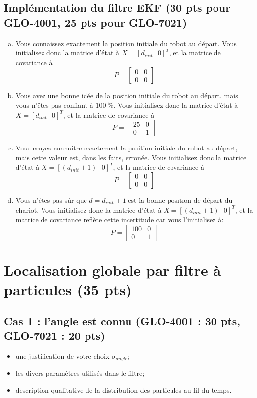 \documentclass[12pt]{article}
\begin{document}
\subsection{Implémentation du filtre EKF (30 pts pour GLO-4001, 25 pts pour GLO-7021)}
\begin{enumerate}[a)]
\item Vous connaissez exactement la position initiale du robot au départ. Vous initialisez donc la matrice d'état à $X=[d_{init} \mbox{ }0]^T$, et la matrice de covariance à
$$
P=
\begin{bmatrix}
0 &0\\
0 & 0
\end{bmatrix}
$$

\item Vous avez une bonne idée de la position initiale du robot au départ, mais vous n'êtes pas confiant à $100~\%$. Vous initialisez donc la matrice d'état à $X=[d_{init} \mbox{ }0]^T$, et la matrice de covariance à
$$
P=
\begin{bmatrix}
25 &0\\
0 & 1
\end{bmatrix}
$$

\item Vous croyez connaitre exactement la position initiale du robot au départ, mais cette valeur est, dans les faits, erronée. Vous initialisez donc la matrice d'état à $X=[(d_{init}+1) \mbox{  } 0]^T$, et la matrice de covariance à
$$
P=
\begin{bmatrix}
0 &0\\
0 & 0
\end{bmatrix}
$$

\item Vous n'êtes pas sûr que $d=d_{init}+1$ est la bonne position de départ du chariot. Vous initialisez donc la matrice d'état à $X=[(d_{init}+1)  \mbox{  }  0]^T$, et la matrice de covariance reflète cette incertitude car vous l'initialisez à:
$$
P=
\begin{bmatrix}
100 &0\\
0 & 1
\end{bmatrix}
$$

\end{enumerate}

\section {Localisation globale par filtre à particules (35 pts)}

\subsection{Cas 1 : l'angle est connu (GLO-4001 : 30 pts, GLO-7021 : 20 pts)}

\begin{itemize}
\item une justification de votre choix $\sigma_{angle}$;
\item les divers paramètres utilisés dans le filtre;
\item description qualitative de la distribution des particules au fil du temps.
\end{itemize}
\end{document}
